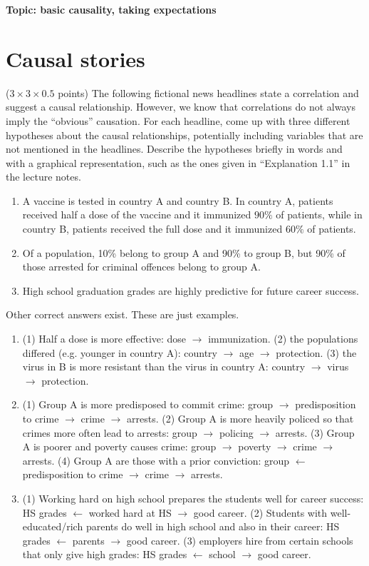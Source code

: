 


\flushleft\textbf{Topic: basic causality, taking expectations}


\section{Causal stories}
($3 \times 3 \times 0.5$ points) The following fictional news headlines state a correlation and suggest a causal relationship. However, we know that correlations do not always imply the ``obvious'' causation. For each headline, come up with three different hypotheses about the causal relationships, potentially including variables that are not mentioned in the headlines. Describe the hypotheses briefly in words and with a graphical representation, such as the ones given in ``Explanation 1.1'' in the lecture notes.

\begin{enumerate}
    \item A vaccine is tested in country A and country B. In country A, patients received half a dose of the vaccine and it immunized $90\%$ of patients, while in country B, patients received the full dose and it immunized $60\%$ of patients.
    \item Of a population, 10\% belong to group A and 90\% to group B, but 90\% of those arrested for criminal offences belong to group A.
    \item High school graduation grades are highly predictive for future career success.
\end{enumerate}
\begin{gradedsolution}
Other correct answers exist. These are just examples.
\begin{enumerate}
    \item (1) Half a dose is more effective: dose $\to$ immunization. (2) the populations differed (e.g. younger in country A): country $\to$ age $\to$ protection. (3) the virus in B is more resistant than the virus in country A: country $\to$ virus $\to$ protection.
    \item (1) Group A is more predisposed to commit crime: group $\to$ predisposition to crime $\to$ crime $\to$ arrests. (2) Group A is more heavily policed so that crimes more often lead to arrests: group $\to$ policing $\to$ arrests. (3) Group A is poorer and poverty causes crime: group $\to$ poverty $\to$ crime $\to$ arrests. (4) Group A are those with a prior conviction: group $\leftarrow$ predisposition to crime $\to$ crime $\to$ arrests.
    \item (1) Working hard on high school prepares the students well for career success: HS grades $\leftarrow$ worked hard at HS $\rightarrow$ good career. (2) Students with well-educated/rich parents do well in high school and also in their career: HS grades $\leftarrow$ parents $\to$ good career. (3) employers hire from certain schools that only give high grades: HS grades $\leftarrow$ school $\to$ good career.
\end{enumerate}
\end{gradedsolution}

